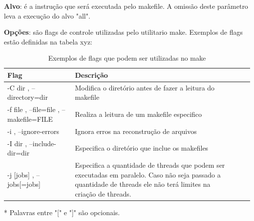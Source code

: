 \textbf{Alvo}: é a instrução que será executada pelo makefile. 
A omissão deste parâmetro leva a execução do alvo "all".
    
\textbf{Opções}: são flags de controle utilizadas pelo utilitario make.
 Exemplos de flags estão definidas na tabela xyz:


\begin{table}[h]
    \label{tab:tabela_01}
    \centering
    \begin{tabular}{ | l|p{10cm} | l|p{10cm} |}
    \hline
    Flag & Descrição\\
    \hline
    -C dir , --directory=dir & Modifica o diretório antes de fazer a leitura do makefile\\
    \hline
    -f file    ,     --file=file     ,  --makefile=FILE & Realiza a leitura de um makefile especifico\\
    \hline
    -i   ,     --ignore-errors & Ignora erros na reconstrução de arquivos\\
    \hline
    -I dir   ,   --include-dir=dir & Especifica o diretório que inclue os makefiles\\
    \hline
    -j [jobs]  , --jobs[=jobs] & Especifica a quantidade de threads
                                 que podem ser executadas em paralelo. 
                                 Caso não seja passado a quantidade de
                                 threads ele não terá limites na criação
                                 de threads.\\
    \hline
    \end{tabular}
    \caption { Exemplos de flags que podem ser utilizadas no make}
\end{table}

    * Palavras entre "[" e "]" são opcionais.
